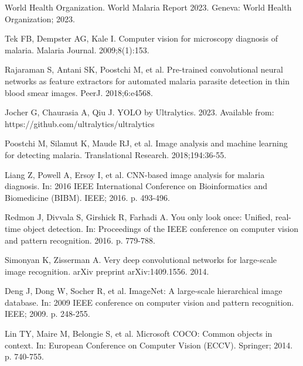 \documentclass[10pt,twocolumn]{article}
\begin{document}
\begin{thebibliography}{10}

World Health Organization. World Malaria Report 2023. Geneva: World Health Organization; 2023.

Tek FB, Dempster AG, Kale I. Computer vision for microscopy diagnosis of malaria. Malaria Journal. 2009;8(1):153.

Rajaraman S, Antani SK, Poostchi M, et al. Pre-trained convolutional neural networks as feature extractors for automated malaria parasite detection in thin blood smear images. PeerJ. 2018;6:e4568.

Jocher G, Chaurasia A, Qiu J. YOLO by Ultralytics. 2023. Available from: https://github.com/ultralytics/ultralytics

Poostchi M, Silamut K, Maude RJ, et al. Image analysis and machine learning for detecting malaria. Translational Research. 2018;194:36-55.

Liang Z, Powell A, Ersoy I, et al. CNN-based image analysis for malaria diagnosis. In: 2016 IEEE International Conference on Bioinformatics and Biomedicine (BIBM). IEEE; 2016. p. 493-496.

Redmon J, Divvala S, Girshick R, Farhadi A. You only look once: Unified, real-time object detection. In: Proceedings of the IEEE conference on computer vision and pattern recognition. 2016. p. 779-788.

Simonyan K, Zisserman A. Very deep convolutional networks for large-scale image recognition. arXiv preprint arXiv:1409.1556. 2014.

Deng J, Dong W, Socher R, et al. ImageNet: A large-scale hierarchical image database. In: 2009 IEEE conference on computer vision and pattern recognition. IEEE; 2009. p. 248-255.

Lin TY, Maire M, Belongie S, et al. Microsoft COCO: Common objects in context. In: European Conference on Computer Vision (ECCV). Springer; 2014. p. 740-755.

\end{thebibliography}
\end{document}
